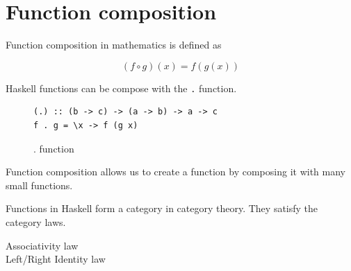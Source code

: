 \documentclass[twoside, a4paper]{article}
\begin{document}
\section{Function composition}

\label{sec:functioncomposition}

Function composition in mathematics is defined as

\begin{equation}
  \label{eq:functioncomposition}
  (f \circ g)(x) = f(g(x))
\end{equation}

Haskell functions can be compose with the \verb|.| function.

\begin{figure}
  \centering
\begin{verbatim}
(.) :: (b -> c) -> (a -> b) -> a -> c
f . g = \x -> f (g x)
\end{verbatim}
  \caption{. function}
  \label{fig:compositionfunction}
\end{figure}

Function composition allows us to create a function by composing it with many small functions. 

Functions in Haskell form a category in category theory. They satisfy the category laws.
\begin{description}
\item[Associativity law] 
\item[Left/Right Identity law] 
\end{description}



\end{document}

